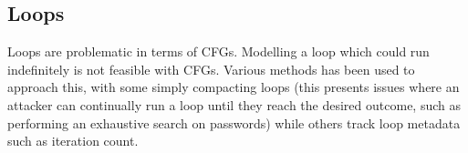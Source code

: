
\fi

\subsection{Loops}
Loops are problematic in terms of CFGs. Modelling a loop which could run indefinitely is not feasible with CFGs. Various methods has been used to approach this, with some \cite{Abadi2005} simply compacting loops (this presents issues where an attacker can continually run a loop until they reach the desired outcome, such as performing an exhaustive search on passwords) while others \cite{Dessouky2017} track loop metadata such as iteration count.
